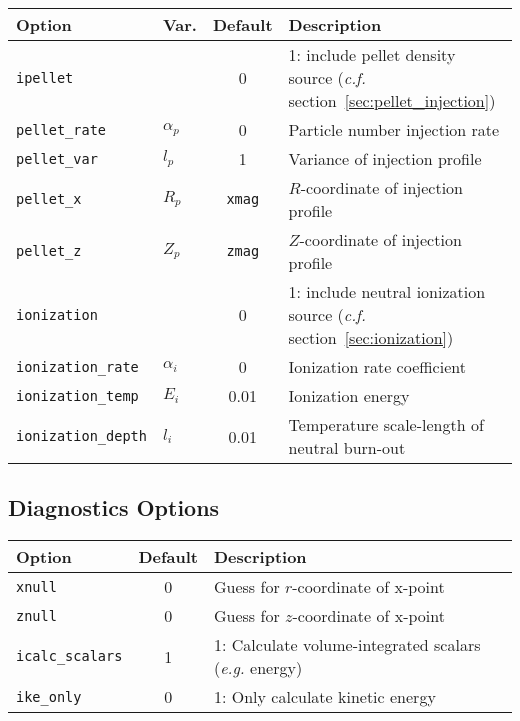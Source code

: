\begin{tabular}{llcp{2in}}
  \textbf{Option}&\textbf{Var.}&\textbf{Default}&\textbf{Description}\\
  \hline
  \texttt{ipellet}      & & 0    & 1: include pellet density
    source (\textit{c.f.} section~\ref{sec:pellet_injection})\\
  \texttt{pellet\_rate} & $\alpha_p$ & 0 
                                     & Particle number injection rate\\
  \texttt{pellet\_var}  & $l_p$      & 1    & Variance of  
                                              injection profile\\
  \texttt{pellet\_x}    & $R_p$      & \texttt{xmag} 
                                     & $R$-coordinate of injection profile\\
  \texttt{pellet\_z}    & $Z_p$      & \texttt{zmag} 
                                     & $Z$-coordinate of injection profile\\
  \texttt{ionization}   & & 0  & 1: include neutral ionization
    source (\textit{c.f.} section~\ref{sec:ionization})\\
  \texttt{ionization\_rate} & $\alpha_i$ & 0 
                                     & Ionization rate coefficient\\
  \texttt{ionization\_temp} & $E_i$   & 0.01 & Ionization energy\\
  \texttt{ionization\_depth}& $l_i$   & 0.01 & Temperature 
    scale-length of neutral burn-out
\end{tabular}


\subsection{Diagnostics Options}

\begin{tabular}{lcp{3in}}
  \textbf{Option}&\textbf{Default}&\textbf{Description}\\
  \hline
  \texttt{xnull}     & 0 & Guess for $r$-coordinate of x-point\\
  \texttt{znull}     & 0 & Guess for $z$-coordinate of x-point\\
  \texttt{icalc\_scalars} & 1 & 1: Calculate volume-integrated scalars 
                                (\textit{e.g.} energy)\\
  \texttt{ike\_only} & 0 & 1: Only calculate kinetic energy
\end{tabular}
